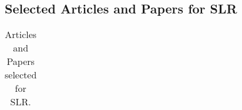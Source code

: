 
\begin{landscape}
    

\section{Selected Articles and Papers for SLR}\label{App:A}

\begin{center}

\begin{longtable}{ | m{5em} | m{25em}| m{22em} | m{4em} | } 
 \caption{Articles and Papers selected for SLR.\label{articles}}\\


\end{longtable}
\end{center}
\end{landscape}
